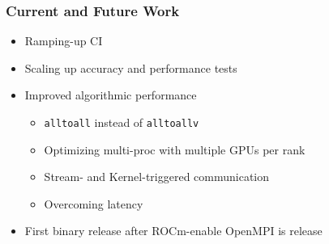 \documentclass[10pt,aspectratio=169]{beamer}
\begin{document}
\begin{frame}
  \frametitle{Current and Future Work}

  \begin{itemize}
  \item Ramping-up CI
  \item Scaling up accuracy and performance tests
  \item Improved algorithmic performance
    \begin{itemize}
    \item \lstinline{alltoall} instead of \lstinline{alltoallv}
    \item Optimizing multi-proc with multiple GPUs per rank
    \item Stream- and Kernel-triggered communication
    \item Overcoming latency
    \end{itemize}
  \item First binary release after ROCm-enable OpenMPI is release
  \end{itemize}
  
\end{frame}
\end{document}
